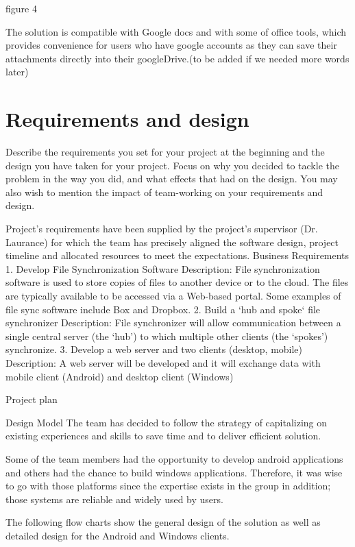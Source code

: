 \documentclass{article}
\begin{document}
figure 4



The solution is compatible with Google docs and with some of office tools, which provides convenience for users who have google accounts as they can save their attachments directly into their googleDrive.(to be added if we needed more words later)




\section{Requirements and design}
Describe the requirements you set for your project at the beginning and the design you have taken for your project. Focus on why you decided to tackle the problem in the way you did, and what effects that had on the design. You may also wish to mention the impact of team-working on your requirements and design.

Project’s requirements have been supplied by the project’s supervisor (Dr. Laurance) for which the team has precisely aligned the software design, project timeline and allocated resources to meet the expectations.
Business Requirements
1.   Develop File Synchronization Software
Description:  File synchronization software is used to store copies of files to another device or to the cloud. The files are typically available to be accessed via a Web-based portal. Some examples of file sync software include Box and Dropbox.
2.   Build a ‘hub and spoke‘ file synchronizer
Description: File synchronizer will allow communication between a single central server (the ‘hub’) to which multiple other clients (the ‘spokes’) synchronize.
3.    Develop a web server and two clients (desktop, mobile)
Description: A web server will be developed and it will exchange data with mobile client (Android) and desktop client (Windows)

Project plan


Design Model
The team has decided to follow the strategy of capitalizing on existing experiences and skills to save time and to deliver efficient solution.

Some of the team members had the opportunity to develop android applications and others had the chance to build windows applications. Therefore, it was wise to go with those platforms since the expertise exists in the group in addition; those systems are reliable and widely used by users.

The following flow charts show the general design of the solution as well as detailed design for the Android and Windows clients.
\end{document}
